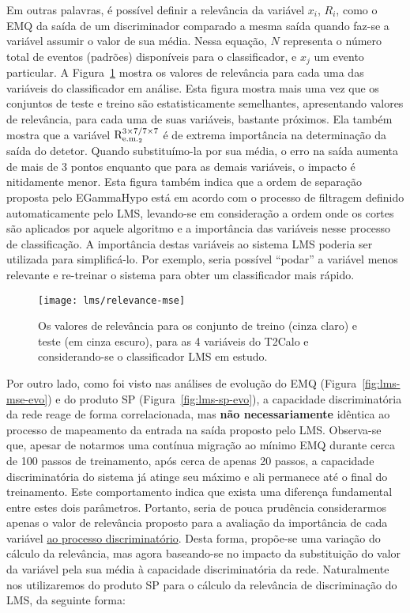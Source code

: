 Em outras palavras, é possível definir a relevância da variável $x_i$, $R_i$,
como o EMQ da saída de um discriminador comparado a mesma saída quando faz-se
a variável assumir o valor de sua média. Nessa equação, $N$ representa o
número total de eventos (padrões) disponíveis para o classificador, e $x_j$ um
evento particular. A Figura~\ref{fig:relevance-mse} mostra os valores de
relevância para cada uma das variáveis do classificador em análise. Esta
figura mostra mais uma vez que os conjuntos de teste e treino são
estatisticamente semelhantes, apresentando valores de relevância, para cada
uma de suas variáveis, bastante próximos. Ela também mostra que a variável
$\text{R}^{3\times7/7\times7}_{\text{e.m.}_{2}}$ é de extrema importância na determinação da saída do detetor. Quando
substituímo-la por sua média, o erro na saída aumenta de mais de 3 pontos
enquanto que para as demais variáveis, o impacto é nitidamente menor. Esta
figura também indica que a ordem de separação proposta pelo EGammaHypo está em
acordo com o processo de filtragem definido automaticamente pelo LMS,
levando-se em consideração a ordem onde os cortes são aplicados por aquele
algoritmo e a importância das variáveis nesse processo de classificação. A
importância destas variáveis ao sistema LMS poderia ser utilizada para
simplificá-lo. Por exemplo, seria possível ``podar'' a variável menos
relevante e re-treinar o sistema para obter um classificador mais rápido.

\begin{figure}
\begin{center}
\texttt{[image: lms/relevance-mse]}
\end{center}
\caption{Os valores de relevância para os conjunto de treino (cinza claro) e
teste (em cinza escuro), para as 4 variáveis do T2Calo e considerando-se o
classificador LMS em estudo.}
\label{fig:relevance-mse}
\end{figure}

Por outro lado, como foi visto nas análises de evolução do EMQ
(Figura~\ref{fig:lms-mse-evo}) e do produto SP (Figura~\ref{fig:lms-sp-evo}),
a capacidade discriminatória da rede reage de forma correlacionada, mas
\textbf{não necessariamente} idêntica ao processo de mapeamento da entrada na
saída proposto pelo LMS. Observa-se que, apesar de notarmos uma contínua
migração ao mínimo EMQ durante cerca de 100 passos de treinamento, após cerca
de apenas 20 passos, a capacidade discriminatória do sistema já atinge seu
máximo e ali permanece até o final do treinamento. Este comportamento indica
que exista uma diferença fundamental entre estes dois parâmetros. Portanto,
seria de pouca prudência considerarmos apenas o valor de relevância proposto
para a avaliação da importância de cada variável \underline{ao processo
discriminatório}. Desta forma, propõe-se uma variação do cálculo da relevância,
mas agora baseando-se no impacto da substituição do valor da variável pela sua
média à capacidade discriminatória da rede. Naturalmente nos utilizaremos do
produto SP para o cálculo da relevância de discriminação do LMS, da seguinte
forma:

